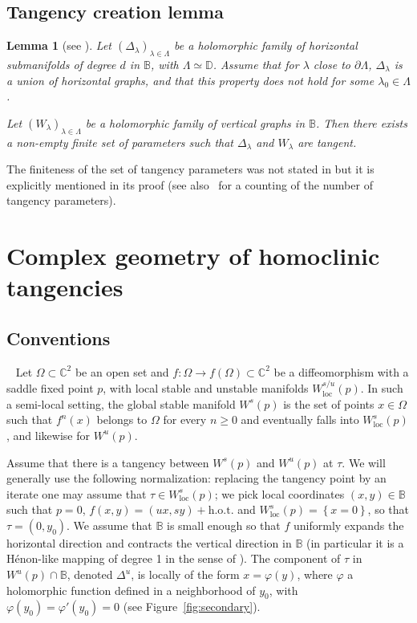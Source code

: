 \documentclass[11pt, oneside]{amsart}
\newcommand{\C}{\mathbb{C}}
\newcommand{\B}{\mathbb{B}}
\newcommand{\D}{\mathbb{D}}
\newcommand{\fr}{\partial}
\newcommand{\set}[1]{\left\{#1\right\}}
\newcommand{\loc}{{\mathrm{loc}}}
\newcommand{\hot}{{\mathrm{h.o.t.}}}
\newtheorem{lem}[prop] {Lemma}
\theoremstyle{remark}
\theoremstyle{definition}
\theoremstyle{theorem}
\newcommand{\commentaire}[1]{}
\begin{document}
 \subsection{Tangency creation lemma}
 
\begin{lem}[see {\cite[Prop. 9.1]{tangencies}}]\label{lem:creating_tangencies}   
Let $(\Delta_\lambda)_{\lambda\in \Lambda}$ be a holomorphic family of horizontal submanifolds of 
degree $d$ in $\B$, with $\Lambda\simeq\D$. Assume that for $\lambda$ close to $\fr\Lambda$, $\Delta_\lambda$ is a union of horizontal graphs, and that  this property does not hold for some $\lambda_0\in \Lambda$. 

Let $(W_\lambda)_{\lambda\in \Lambda}$ be a holomorphic family of vertical graphs in $\B$. Then 
there exists a non-empty finite set of parameters such that $\Delta_\lambda$ and $W_\lambda$ are tangent. 
\end{lem}

The finiteness of the set of tangency parameters was not stated in 
 \cite[Prop. 9.1]{tangencies} but it is explicitly mentioned in its proof 
(see also~\cite{taflin-tangencies} for a counting of the number of tangency parameters).
 



\section{Complex geometry of homoclinic tangencies}\label{sec:complex_tangencies}

\subsection{Conventions}\label{subs:conventions} ~\commentaire{Lots of changes in this subsection, in preparation for \S 4.3 (cf. Exposition remark \#2}
Let $\Omega\subset \C^2$ be an open set and $f:\Omega \to f(\Omega)\subset \C^2$ be a diffeomorphism with a saddle fixed point $p$, with local stable and unstable manifolds 
$W^{s/u}_\loc(p)$. 
In such a semi-local setting, the global stable  
  manifold $W^{s}(p)$ is the set of points $x\in\Omega$ such that $f^{n}(x)$ belongs to $\Omega$ for every $n\geq 0$ and eventually falls into $W^{s}_\loc(p)$, and likewise for $W^u(p)$. 
  
Assume that there is a  tangency between $W^s(p)$ and $W^u(p)$ at $\tau$. 
We will generally
 use the following normalization: replacing the tangency point by an iterate  
 one may assume that $\tau\in W^s_\loc(p)$;
we pick local coordinates $(x,y)\in \B$ 
such that $p=0$, $f(x,y)  = (ux, sy)+ \hot$ and 
$W^s_\loc(p) = \set{x=0}$, so that $\tau= (0, y_0)$. We assume that $\B$ is small enough  so that $f$ uniformly expands the horizontal direction and contracts the vertical direction in $\B$ (in particular it is a Hénon-like mapping of degree 1 in the sense of \cite{henonl}).
The component  of $\tau$ in $W^u(p)\cap \B$, 
denoted $\Delta^u$, is locally of the form $x = \varphi(y)$, where 
$\varphi$  a holomorphic function defined in a neighborhood of $y_0$, with 
$\varphi(y_0) = \varphi'(y_0) = 0$ (see Figure~\ref{fig:secondary}).
\end{document}
